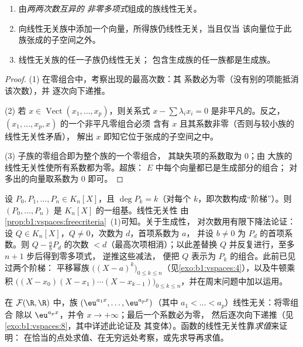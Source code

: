 \begin{proposition}[实用的线性无关判别准则]\label{prop:b1:vspaces:freecriteria}
\begin{enumerate}
  \item 由\emph{两两次数互异的
        非零多项式}组成的族线性无关。
  \item 向线性无关族中添加一个向量，所得族仍线性无关，当且仅当
        该向量位于此族张成的子空间之外。
  \item 线性无关族的任一子族仍线性无关；
        包含生成族的任一族都是生成族。
\end{enumerate}
\end{proposition}

\begin{proof}
(1) 在零组合中，考察出现的最高次数：其
系数必为零（没有别的项能抵消该次数），并
逐次向下递推。

(2) 若 $x \in \operatorname{Vect}(x_1, \dots, x_p)$，则关系式 $x
- \sum\lambda_i x_i = 0$ 是非平凡的。反之，
$(x_1, \dots, x_p, x)$ 的一个非平凡零组合必须
含有 $x$ 且其系数非零（否则与较小族的线性无关性矛盾），
解出 $x$ 即知它位于张成的子空间之中。

(3) 子族的零组合即为整个族的一个零组合，
其缺失项的系数取为 $0$；由
大族的线性无关性使所有系数都为零。超族：
$E$ 中每个向量都已是生成部分的组合；
对多出的向量取系数为 $0$ 即可。
\end{proof}

\begin{example}[阶梯原理]
\label{ex:b1:vspaces:staircase}
设 $P_0, P_1, \dots, P_n \in K_n[X]$，且 $\deg P_k = k$（对每个
$k$，即次数构成“阶梯”）。则 $(P_0, \dots, P_n)$ 是
$K_n[X]$ 的一组基。线性无关性
由\cref{prop:b1:vspaces:freecriteria}~(1)可知。关于生成性，
对次数用有限下降法论证：设 $Q \in
K_n[X]$，$Q \neq 0$，次数为 $d$，首项系数为 $a$，
并设 $b \neq 0$ 为 $P_d$ 的首项系数。则 $Q -
\frac ab P_d$ 的次数 $< d$（最高次项相消）；以此差替换
$Q$ 并反复进行，至多 $n + 1$ 步后得到零多项式，
逆推这些减法，
便把 $Q$ 表示为 $P_k$ 的组合。此前已见过两个阶梯：
平移幂族 $\bigl((X-a)^k\bigr)_{0 \leq k
\leq n}$（见\cref{exo:b1:vspaces:4}），以及牛顿乘积
$\bigl((X - x_0)(X - x_1)\cdots(X - x_{k-1})\bigr)_{0 \leq k \leq
n}$，并在周末问题中加以运用。
\end{example}

\begin{example}[函数空间中的线性无关性]\label{ex:b1:vspaces:functionfree}
在 $\mathcal{F}(\R,\R)$ 中，族 $(\eu^{a_1 x}, \dots, \eu^{a_p
x})$（其中 $a_1 < \dots < a_p$）线性无关：将零组合
除以 $\eu^{a_p x}$，并令 $x \to +\infty$；最后一个系数必为零，
然后逐次向下递推（见\cref{exo:b1:vspaces:8}，其中详述此论证及
其变体）。函数的线性无关性靠\emph{求值}来证明：
在恰当的点处求值、在无穷远处考察，或先求导再求值。
\end{example}

